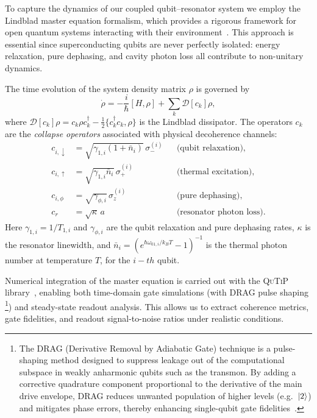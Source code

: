 To capture the dynamics of our coupled qubit–resonator system we employ the 
Lindblad master equation formalism, which provides a rigorous framework for 
open quantum systems interacting with their environment~\cite{Breuer2002,blais2021circuit}. 
This approach is essential since superconducting qubits are never perfectly isolated: 
energy relaxation, pure dephasing, and cavity photon loss all contribute to 
non-unitary dynamics.

The time evolution of the system density matrix $\rho$ is governed by
\begin{equation}
\dot{\rho} = -\frac{i}{\hbar}[H,\rho] + \sum_{k}\mathcal{D}[c_k]\rho,
\end{equation}
where $\mathcal{D}[c_k]\rho = c_k\rho c_k^\dagger - \tfrac{1}{2}\{c_k^\dagger c_k,\rho\}$ 
is the Lindblad dissipator. The operators $c_k$ are the 
\emph{collapse operators} associated with physical decoherence channels:
\begin{align}
c_{i,\downarrow} &= \sqrt{\gamma_{1,i}(1+\bar{n}_i)}\, \sigma_{-}^{(i)} 
&& \text{(qubit relaxation)}, \\
c_{i,\uparrow}   &= \sqrt{\gamma_{1,i}\bar{n}_i}\, \sigma_{+}^{(i)} 
&& \text{(thermal excitation)}, \\
c_{i,\phi}       &= \sqrt{\gamma_{\phi,i}}\, \sigma_{z}^{(i)} 
&& \text{(pure dephasing)}, \\
c_{r}            &= \sqrt{\kappa}\, a 
&& \text{(resonator photon loss)}.
\end{align}
Here $\gamma_{1,i}=1/T_{1,i}$ and $\gamma_{\phi,i}$ are the qubit relaxation and pure 
dephasing rates, $\kappa$ is the resonator linewidth, and 
$\bar{n}_i = (e^{\hbar \omega_{01,i}/k_BT}-1)^{-1}$ is the thermal photon number at temperature $T$, for the $i-th$ qubit.

Numerical integration of the master equation is carried out with the 
\textsc{QuTiP} library~\cite{Johansson2013,qutip5}, enabling both time-domain gate simulations 
(with DRAG pulse shaping \footnote{The DRAG (Derivative Removal by Adiabatic Gate) technique is a pulse-shaping 
method designed to suppress leakage out of the computational subspace in weakly 
anharmonic qubits such as the transmon. By adding a corrective quadrature component 
proportional to the derivative of the main drive envelope, DRAG reduces unwanted 
population of higher levels (e.g.\ $\ket{2}$) and mitigates phase errors, thereby enhancing single-qubit gate fidelities~\cite{Motzoi2009, Gambetta2011}.}) and steady-state readout analysis. This allows us 
to extract coherence metrics, gate fidelities, and readout signal-to-noise ratios 
under realistic conditions.

